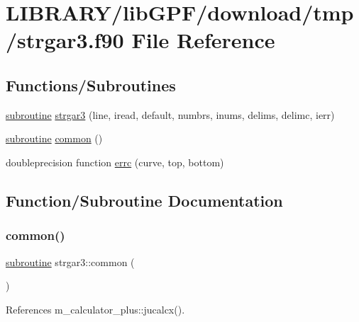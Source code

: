 \hypertarget{strgar3_8f90}{}\section{L\+I\+B\+R\+A\+R\+Y/lib\+G\+P\+F/download/tmp/strgar3.f90 File Reference}
\label{strgar3_8f90}
\subsection*{Functions/\+Subroutines}
\begin{DoxyCompactItemize}
\item 
\hyperlink{M__stopwatch_83_8txt_acfbcff50169d691ff02d4a123ed70482}{subroutine} \hyperlink{strgar3_8f90_a0934cb639dc2db3450626e1515726e8c}{strgar3} (line, iread, default, numbrs, inums, delims, delimc, ierr)
\item 
\hyperlink{M__stopwatch_83_8txt_acfbcff50169d691ff02d4a123ed70482}{subroutine} \hyperlink{strgar3_8f90_a96cfa8fe4e730b87185eb5629575c039}{common} ()
\item 
doubleprecision function \hyperlink{strgar3_8f90_adec4c296d118e928067278d0eda4d60c}{errc} (curve, top, bottom)
\end{DoxyCompactItemize}


\subsection{Function/\+Subroutine Documentation}
\mbox{\label{strgar3_8f90_a96cfa8fe4e730b87185eb5629575c039}} 
\subsubsection{\texorpdfstring{common()}{common()}}
{\footnotesize\ttfamily \hyperlink{M__stopwatch_83_8txt_acfbcff50169d691ff02d4a123ed70482}{subroutine} strgar3\+::common (\begin{DoxyParamCaption}{ }\end{DoxyParamCaption})}



References m\+\_\+calculator\+\_\+plus\+::jucalcx().

\mbox{\label{strgar3_8f90_adec4c296d118e928067278d0eda4d60c}} 
